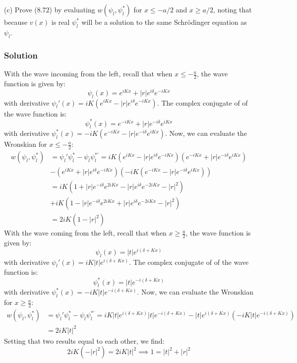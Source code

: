 \documentclass[12pt]{article}
\begin{document}
\subsection{}
(c) Prove (8.72) by evaluating $w\left(\psi_l, \psi_l^*\right)$ for $x \leqslant-a / 2$ and $x \geqslant a / 2$, noting that because $v(x)$ is real $\psi_l^*$ will be a solution to the same Schrödinger equation as $\psi_l$.
\subsubsection{Solution}
With the wave incoming from the left, recall that when $x \leq -\frac{a}{2}$, the wave function is given by:
\begin{equation}
    \psi_l(x) = e^{iKx} + |r|e^{i\delta}e^{-iKx}
\end{equation}
with derivative $\psi_l'(x) = iK\left(e^{iKx} - |r|e^{i\delta}e^{-iKx}\right)$. The complex conjugate of of the wave function is:
\begin{equation}
    \psi_l^*(x) = e^{-iKx} + |r|e^{-i\delta}e^{iKx}
\end{equation}
with derivative $\psi_l^*(x) = -iK\left(e^{-iKx} - |r|e^{-i\delta}e^{iKx}\right)$. Now, we can evaluate the Wronskian for $x \leq -\frac{a}{2}$:
\begin{align}
    w(\psi_l, \psi_l^*) &= \psi_l'\psi_l^* - \psi_l\psi_l^{*'} = iK\left(e^{iKx} - |r|e^{i\delta}e^{-iKx}\right)\left(e^{-iKx} + |r|e^{-i\delta} e^{iKx}\right)\\
    &- \left(e^{iKx} + |r|e^{i\delta}e^{-iKx}\right)\left(-iK\left(e^{-iKx} - |r|e^{-i\delta}e^{iKx}\right)\right)\\
    &= iK\left(1 + |r|e^{-i\delta}e^{2iKx} - |r|e^{i\delta}e^{-2iKx} - |r|^2\right)\\
    &+ iK\left(1 - |r|e^{-i\delta}e^{2iKx} + |r|e^{i\delta}e^{-2iKx} - |r|^2\right)\\
    &= 2iK\left(1 - |r|^2\right)
\end{align}
With the wave coming from the left, recall that when $x \geq \frac{a}{2}$, the wave function is given by:
\begin{equation}
    \psi_l(x) = |t|e^{i\left(\delta + Kx\right)}
\end{equation}
with derivative $\psi_l'(x) = iK|t|e^{i\left(\delta + Kx\right)}$. The complex conjugate of of the wave function is:
\begin{equation}
    \psi_l^*(x) = |t|e^{-i\left(\delta + Kx\right)}
\end{equation}
with derivative $\psi_l^*(x) = -iK|t|e^{-i\left(\delta + Kx\right)}$. Now, we can evaluate the Wronskian for $x \geq \frac{a}{2}$:
\begin{align}
    w(\psi_l, \psi_l^*) &= \psi_l'\psi_l^* - \psi_l\psi_l^{*'} = iK|t|e^{i\left(\delta + Kx\right)}|t|e^{-i\left(\delta + Kx\right)} - |t|e^{i\left(\delta + Kx\right)}\left(-iK|t|e^{-i\left(\delta + Kx\right)}\right)\\
    &= 2iK|t|^2
\end{align}
Setting that two results equal to each other, we find:
\begin{equation}
    2iK\left( - |r|^2\right) = 2iK|t|^2 \implies 1 = |t|^2 + |r|^2
\end{equation}
\end{document}
